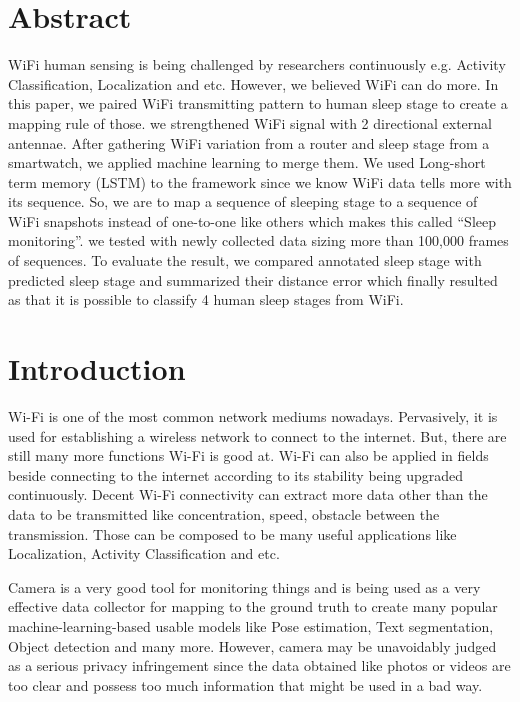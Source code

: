\documentclass[10pt,letterpaper]{article}
\begin{document}
	\section*{Abstract}
	WiFi human sensing is being challenged by researchers continuously e.g. Activity Classification, Localization and etc. However, we believed WiFi can do more. In this paper, we paired WiFi transmitting pattern to human sleep stage to create a mapping rule of those. we strengthened WiFi signal with 2 directional external antennae. After gathering WiFi variation from a router and sleep stage from a smartwatch, we applied machine learning to merge them. We used Long-short term memory (LSTM) to the framework since we know WiFi data tells more with its sequence. So, we are to map a sequence of sleeping stage to a sequence of WiFi snapshots instead of one-to-one like others which makes this called ``Sleep monitoring''. we tested with newly collected data sizing more than 100,000 frames of sequences. To evaluate the result, we compared annotated sleep stage with predicted sleep stage and summarized their distance error which finally resulted as that it is possible to classify 4 human sleep stages from WiFi.
	

	
	\linenumbers
	
	\section*{Introduction}
	Wi-Fi is one of the most common network mediums nowadays. Pervasively, it is used for establishing a wireless network to connect to the internet. But, there are still many more functions Wi-Fi is good at. Wi-Fi can also be applied in fields beside connecting to the internet according to its stability being upgraded continuously. Decent Wi-Fi connectivity can extract more data other than the data to be transmitted like concentration, speed, obstacle between the transmission. Those can be composed to be many useful applications like Localization, Activity Classification and etc.
	
	
	Camera is a very good tool for monitoring things and is being used as a very effective data collector for mapping to the ground truth to create many popular machine-learning-based usable models like Pose estimation, Text segmentation, Object detection and many more. However, camera may be unavoidably judged as a serious privacy infringement since the data obtained like photos or videos are too clear and possess too much information that might be used in a bad way.
	
\end{document}
